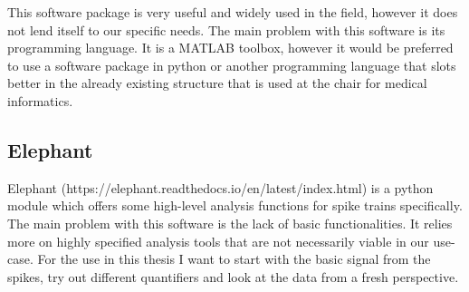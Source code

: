 

This software package is very useful and widely used in the field, however it does not lend itself to our specific needs.
The main problem with this software is its programming language. It is a MATLAB toolbox, however it would be preferred to use a software package in python or another programming language that slots better in the already existing structure that is used at the chair for medical informatics.  

\subsection{Elephant}
Elephant (https://elephant.readthedocs.io/en/latest/index.html) is a python module which offers some high-level analysis functions for spike trains specifically.  The main problem with this software is the lack of basic functionalities.  It relies more on highly specified analysis tools that are not necessarily viable in our use-case.  For the use in this thesis I want to start with the basic signal from the spikes, try out different quantifiers and look at the data from a fresh perspective. 

